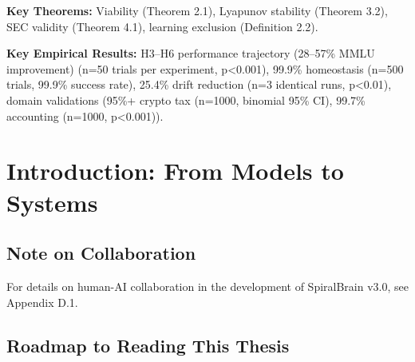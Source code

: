 \documentclass[12pt,a4paper]{report}
\begin{document}
\textbf{Key Theorems:} Viability (Theorem 2.1), Lyapunov stability (Theorem 3.2), SEC validity (Theorem 4.1), learning exclusion (Definition 2.2).

\textbf{Key Empirical Results:} H3–H6 performance trajectory (28–57\% MMLU improvement) (n=50 trials per experiment, p<0.001), 99.9\% homeostasis (n=500 trials, 99.9\% success rate), 25.4\% drift reduction (n=3 identical runs, p<0.01), domain validations (95\%+ crypto tax (n=1000, binomial 95\% CI), 99.7\% accounting (n=1000, p<0.001)). \\


\chapter{Introduction: From Models to Systems}

\section*{Note on Collaboration}
For details on human-AI collaboration in the development of SpiralBrain v3.0, see Appendix D.1.

\section*{Roadmap to Reading This Thesis}
\end{document}
